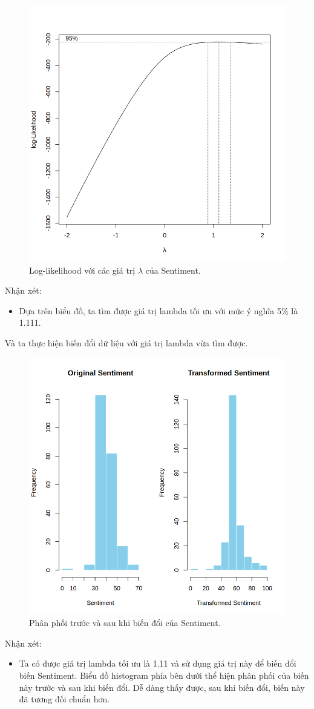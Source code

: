 \begin{figure}[H]
    \centering
    \includegraphics[width=0.75\columnwidth]{csm_figures/sentiment_optimal_lambda.png}
    \caption{Log-likelihood với các giá trị $\lambda$ của Sentiment.}
    \label{fig:sentiment_optimal_lambda}
\end{figure}
Nhận xét:
\begin{itemize}
    \item Dựa trên biểu đồ, ta tìm được giá trị lambda tối ưu với mức ý nghĩa 5\% là 1.111.
\end{itemize}

Và ta thực hiện biến đổi dữ liệu với giá trị lambda vừa tìm được.
\begin{figure}[H]
    \centering
    \includegraphics[width=0.75\columnwidth]{csm_figures/sentiment_transformed_distribution.png}
    \caption{Phân phối trước và sau khi biến đổi của Sentiment.}
    \label{fig:sentiment_transformed_distribution}
\end{figure}
Nhận xét:
\begin{itemize}
    \item Ta có được giá trị lambda tối ưu là 1.11 và sử dụng giá trị này để biến đổi biến Sentiment. Biểu đồ histogram phía bên dưới thể hiện phân phối của biến này trước và sau khi biến đổi. Dễ dàng thấy được, sau khi biến đổi, biến này đã tương đối chuẩn hơn.
\end{itemize}

